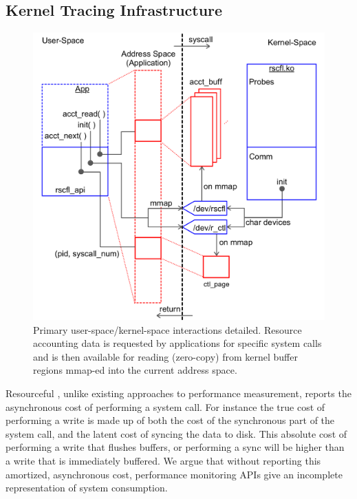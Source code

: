 \documentclass[letterpaper,twocolumn,10pt]{article}
\newcommand{\pname}{Resourceful}
\begin{document}


\subsection{Kernel Tracing Infrastructure}

\begin{figure}[ht!]
    \centering
	\includegraphics[width=\columnwidth]{sys_design}
    \caption{Primary user-space/kernel-space interactions detailed. Resource accounting data is requested by applications for specific system calls and is then available for reading (zero-copy) from kernel buffer regions mmap-ed into the current address space. }
    \label{fig:design}
\end{figure}

\pname{ }, unlike existing approaches to performance measurement, reports the asynchronous cost of performing a system call.
For instance the true cost of performing a write is made up of both the cost of the synchronous part of the system call, and the latent cost of syncing the data to disk.
This absolute cost of performing a write that flushes buffers, or performing a sync will be higher than a write that is immediately buffered.
We argue that without reporting this amortized, asynchronous cost, performance monitoring APIs give an incomplete representation of system consumption.
\end{document}
